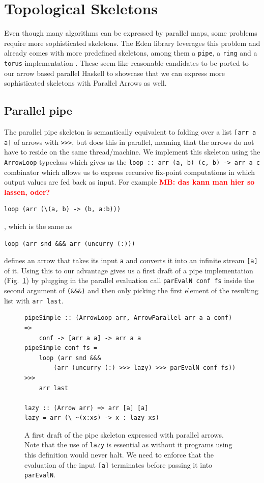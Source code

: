 \documentclass{jfp1}
\renewcommand{\cite}[1]{\citep{#1}}
\newcommand{\inlinecode}[1]{\texttt{#1}}
\newcommand{\comm}[2]{\textcolor{red}{\bfseries #1: #2}}
\newcommand{\mbcomment}[1]{\comm{MB}{#1}}
\begin{document}
	\FloatBarrier
\section{Topological Skeletons}
\label{sec:topology-skeletons}
Even though many algorithms can be expressed by parallel maps, some problems require more sophisticated skeletons. The Eden library leverages this problem and already comes with more predefined skeletons, among them a \inlinecode{pipe}, a \inlinecode{ring} and a \inlinecode{torus} implementation \cite{Loogen2012, eden_skel_topology}. These seem like reasonable candidates to be ported to our arrow based parallel Haskell to showcase that we can express more sophisticated skeletons with Parallel Arrows as well.

\subsection{Parallel pipe}

The parallel pipe skeleton is semantically equivalent to folding over a list \inlinecode{[arr a a]} of arrows with \inlinecode{>>>}, but does this in parallel, meaning that the arrows do not have to reside on the same thread/machine. We implement this skeleton using the \inlinecode{ArrowLoop} typeclass which gives us the \inlinecode{loop :: arr (a, b) (c, b) -> arr a c} combinator which allows us to express recursive fix-point computations in which output values are fed back as input. For example %
\mbcomment{das kann man hier so lassen, oder?}
\begin{lstlisting}[frame=htrbl]
loop (arr (\(a, b) -> (b, a:b)))
\end{lstlisting}
, which is the same as
\begin{lstlisting}[frame=htrbl]
loop (arr snd &&& arr (uncurry (:)))
\end{lstlisting}
defines an arrow that takes its input \inlinecode{a} and converts it into an infinite stream \inlinecode{[a]} of it. Using this to our advantage gives us a first draft of a pipe implementation (Fig.~\ref{fig:pipeSimple}) by plugging in the parallel evaluation call \inlinecode{parEvalN conf fs} inside the second argument of \inlinecode{(\&\&\&)} and then only picking the first element of the resulting list with \inlinecode{arr last}.
\begin{figure}[h]
\begin{lstlisting}[frame=htrbl]
pipeSimple :: (ArrowLoop arr, ArrowParallel arr a a conf) =>
	conf -> [arr a a] -> arr a a
pipeSimple conf fs =
	loop (arr snd &&&
		(arr (uncurry (:) >>> lazy) >>> parEvalN conf fs)) >>>
	arr last

lazy :: (Arrow arr) => arr [a] [a]
lazy = arr (\ ~(x:xs) -> x : lazy xs)
\end{lstlisting}
\caption{A first draft of the pipe skeleton expressed with parallel arrows. Note that the use of \inlinecode{lazy} is essential as without it programs using this definition would never halt. We need to enforce that the evaluation of the input \inlinecode{[a]} terminates before passing it into \inlinecode{parEvalN}.}
\label{fig:pipeSimple}
\end{figure}
\end{document}
